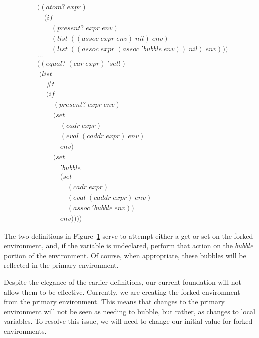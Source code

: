 \begin{figure}[htp]
\caption{}\label{fig:scopeReflectionTweaks}
\begin{align*}
& ((atom? \; expr) \; 
\\& \quad (if
\\& \qquad (present? \; expr \; env)
\\& \qquad (list \; ((assoc \; expr \; env) \; nil) \; env)
\\& \qquad (list \; ((assoc \; expr \; (assoc \; 'bubble \; env)) \; nil) \; env)))
\\& \dots \; 
\\& ((equal? \; (car \; expr) \; 'set!)
\\& \; (list \; 
\\& \quad \; \#t \; 
\\& \quad \; (if
\\& \qquad \; (present? \; expr \; env)
\\& \qquad \; (set \; 
\\& \qquad \quad \; (cadr \; expr) \; 
\\& \qquad \quad \; (eval \; (caddr \; expr) \; env) \; 
\\& \qquad \quad \; env)
\\& \qquad \; (set
\\& \qquad \quad \; 'bubble
\\& \qquad \quad \; (set
\\& \qquad \qquad \; (cadr \; expr)
\\& \qquad \qquad \; (eval \; (caddr \; expr) \; env)
\\& \qquad \qquad \; (assoc \; 'bubble \; env))
\\& \qquad \quad \; env)))) \; 
\end{align*}
\end{figure}

The two definitions in Figure~\ref{fig:scopeReflectionTweaks} serve to attempt
either a get or set on the forked environment, and, if the variable is
undeclared, perform that action on the $bubble$ portion of the environment. Of
course, when appropriate, these bubbles will be reflected in the primary
environment.

Despite the elegance of the earlier definitions, our current foundation will
not allow them to be effective. Currently, we are creating the forked
environment from the primary environment. This means that changes to the
primary environment will not be seen as needing to bubble, but rather, as 
changes to local variables. To resolve this issue, we will need to change our
initial value for forked environments.

